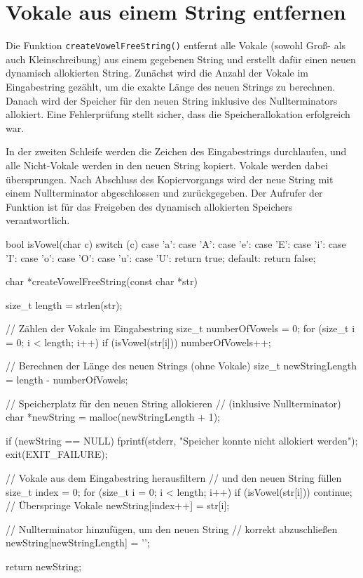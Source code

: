 \chapter{Vokale aus einem String entfernen}

Die Funktion \texttt{createVowelFreeString()} entfernt alle Vokale
(sowohl Groß- als auch Kleinschreibung) aus einem gegebenen String und erstellt
dafür einen neuen dynamisch allokierten String. Zunächst wird die Anzahl der
Vokale im Eingabestring gezählt, um die exakte Länge des neuen Strings zu
berechnen. Danach wird der Speicher für den neuen String inklusive des
Nullterminators allokiert. Eine Fehlerprüfung stellt sicher, dass die
Speicherallokation erfolgreich war.

In der zweiten Schleife werden die Zeichen des Eingabestrings durchlaufen, und
alle Nicht-Vokale werden in den neuen String kopiert. Vokale werden dabei
übersprungen. Nach Abschluss des Kopiervorgangs wird der neue String mit einem
Nullterminator abgeschlossen und zurückgegeben. Der Aufrufer der Funktion ist
für das Freigeben des dynamisch allokierten Speichers verantwortlich.

\begin{codebox}[lang=c, fontsize=\small]
bool isVowel(char c) {
    switch (c) {
    case 'a': case 'A':
    case 'e': case 'E':
    case 'i': case 'I':
    case 'o': case 'O':
    case 'u': case 'U':
        return true;
    default:
        return false;
    }
}

char *createVowelFreeString(const char *str) {
    size_t length = strlen(str);

    // Zählen der Vokale im Eingabestring
    size_t numberOfVowels = 0;
    for (size_t i = 0; i < length; i++) {
        if (isVowel(str[i])) {
            numberOfVowels++;
        }
    }

    // Berechnen der Länge des neuen Strings (ohne Vokale)
    size_t newStringLength = length - numberOfVowels;

    // Speicherplatz für den neuen String allokieren
    // (inklusive Nullterminator)
    char *newString = malloc(newStringLength + 1);

    if (newString == NULL) {
        fprintf(stderr, "Speicher konnte nicht allokiert werden\n");
        exit(EXIT_FAILURE);
    }

    // Vokale aus dem Eingabestring herausfiltern
    // und den neuen String füllen
    size_t index = 0;
    for (size_t i = 0; i < length; i++) {
        if (isVowel(str[i])) {
            continue; // Überspringe Vokale
        }
        newString[index++] = str[i];
    }

    // Nullterminator hinzufügen, um den neuen String
    // korrekt abzuschließen
    newString[newStringLength] = '\0';

    return newString;
}
\end{codebox}




